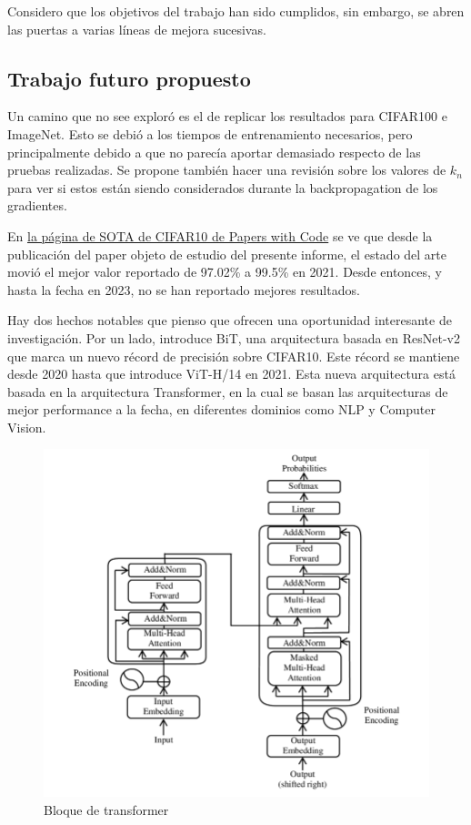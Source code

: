 \documentclass[titlepage,a4paper,oneside]{article}
\begin{document}
Considero que los objetivos del trabajo han sido cumplidos, sin embargo, se abren las puertas a varias líneas de mejora sucesivas.

\subsection{Trabajo futuro propuesto}
Un camino que no see exploró es el de replicar los resultados para CIFAR100 e ImageNet. Esto se debió a los tiempos de entrenamiento necesarios, pero principalmente debido a que no parecía aportar demasiado respecto de las pruebas realizadas. Se propone también hacer una revisión sobre los valores de $k_n$ para ver si estos están siendo considerados durante la backpropagation de los gradientes.

En \href{https://paperswithcode.com/sota/image-classification-on-cifar-10}{la página de SOTA de CIFAR10 de Papers with Code} se ve que desde la publicación del paper objeto de estudio del presente informe, el estado del arte movió el mejor valor reportado de 97.02\% a 99.5\% en 2021. Desde entonces, y hasta la fecha en 2023, no se han reportado mejores resultados.

Hay dos hechos notables que pienso que ofrecen una oportunidad interesante de investigación. Por un lado, \cite{kolesnikov2020big} introduce BiT, una arquitectura basada en ResNet-v2 que marca un nuevo récord de precisión sobre CIFAR10. Este récord se mantiene desde 2020 hasta que \cite{dosovitskiy2021image} introduce ViT-H/14 en 2021. Esta nueva arquitectura está basada en \cite{vaswani2023attention} la arquitectura Transformer, en la cual se basan las arquitecturas de mejor performance a la fecha, en diferentes dominios como NLP y Computer Vision.

\begin{figure}[H]
\centering
\includegraphics[width=\textwidth]{images/TransformerBlock.png}
\caption{Bloque de transformer}
\label{transformer}
\end{figure}
\end{document}
